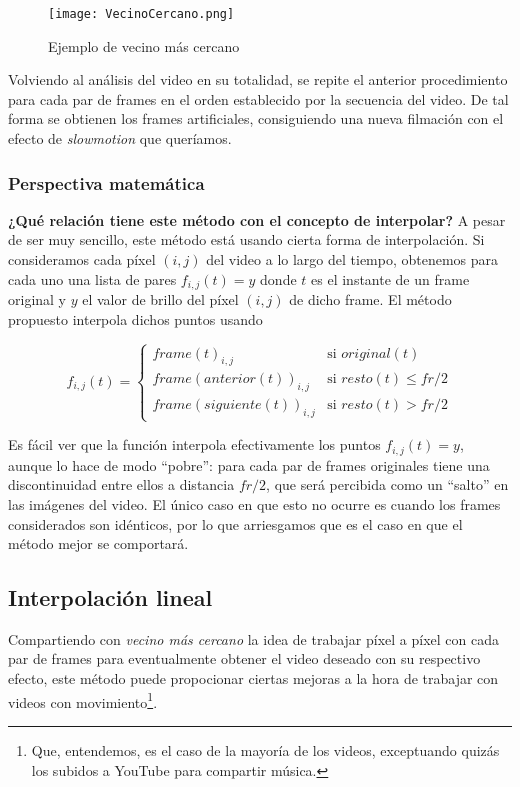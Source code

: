 \begin{figure}[h!]
  \centering
    \texttt{[image: VecinoCercano.png]}
     \caption{Ejemplo de vecino m\'as cercano}\label{fig:vecino}
\end{figure}
\noindent

Volviendo al an\'alisis del video en su totalidad, se repite el anterior procedimiento para cada par de frames en el orden establecido por la secuencia del video. De tal forma se obtienen los frames artificiales, consiguiendo una nueva filmaci\'on con el efecto de \textit{slowmotion} que queríamos. 

\subsubsection*{\bf{Perspectiva matem\'atica}}

\textbf{¿Qu\'e relaci\'on tiene este m\'etodo con el concepto de interpolar?} A pesar de ser muy sencillo, este método está usando cierta forma de interpolación. Si consideramos cada píxel $(i, j)$ del video a lo largo del tiempo, obtenemos para cada uno una lista de pares $f_{i,j}(t)=y$ donde $t$ es el instante de un frame original y $y$ el valor de brillo del píxel $(i,j)$ de dicho frame. El método propuesto interpola dichos puntos usando 

\[
f_{i,j}(t) = 
\left\{
    \begin{array}{ll}
        frame(t)_{i,j} & \mbox{si } original(t) \\
        frame(anterior(t))_{i,j} & \mbox{si } resto(t) \leq fr/2 \\     
        frame(siguiente(t))_{i,j} & \mbox{si } resto(t) > fr/2
    \end{array}
\right.
\]

Es fácil ver que la función interpola efectivamente los puntos $f_{i,j}(t)=y$, aunque lo hace de modo ``pobre'': para cada par de frames originales tiene una discontinuidad entre ellos a distancia $fr/2$, que será percibida como un ``salto'' en las imágenes del video. El único caso en que esto no ocurre es cuando los frames considerados son idénticos, por lo que arriesgamos que es el caso en que el método mejor se comportará.

\subsection{Interpolaci\'on lineal}

Compartiendo con \emph{vecino m\'as cercano} la idea de trabajar píxel a píxel con cada par de frames para eventualmente obtener el video deseado con su respectivo efecto, este método puede propocionar ciertas mejoras a la hora de trabajar con videos con movimiento\footnote{Que, entendemos, es el caso de la mayoría de los videos, exceptuando quizás los subidos a YouTube para compartir música.}.


